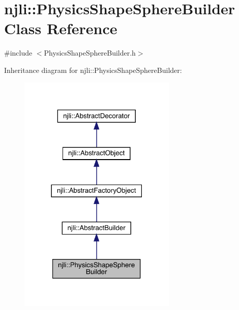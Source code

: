 \hypertarget{classnjli_1_1_physics_shape_sphere_builder}{}\section{njli\+:\+:Physics\+Shape\+Sphere\+Builder Class Reference}
\label{classnjli_1_1_physics_shape_sphere_builder}


{\ttfamily \#include $<$Physics\+Shape\+Sphere\+Builder.\+h$>$}



Inheritance diagram for njli\+:\+:Physics\+Shape\+Sphere\+Builder\+:\nopagebreak
\begin{figure}[H]
\begin{center}
\leavevmode
\includegraphics[width=213pt]{classnjli_1_1_physics_shape_sphere_builder__inherit__graph}
\end{center}
\end{figure}


